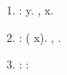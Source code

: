 \documentclass[a4paper]{article}
\newcommand\textstyleStrongEmphasis[1]{\textbf{#1}}
\newcommand\liststyleLiv{%
\renewcommand\theenumi{\arabic{enumi}}
\renewcommand\labelenumi{\theenumi.}
\renewcommand\labelitemi{{\textbullet}}
\renewcommand\labelitemii{{\textbullet}}
\renewcommand\labelitemiii{{\textbullet}}
}
\begin{document}
\liststyleLiv
\begin{enumerate}
\item {
\textstyleStrongEmphasis{\textmd{{\CYRP}{\cyro}{\cyri}{\cyrs}{\cyrk}
{\cyrn}{\cyra}{\cyrch}{\cyra}{\cyrl}{\cyrsftsn}{\cyrn}{\cyro}{\cyrishrt}
{\cyrt}{\cyro}{\cyrch}{\cyrk}{\cyri}}}:\newline
{\CYRV}{\cyrery}{\cyrb}{\cyri}{\cyrr}{\cyra}{\cyre}{\cyrt}{\cyrs}{\cyrya} {\cyrt}{\cyro}{\cyrch}{\cyrk}{\cyra} {\cyrs}
{\cyrm}{\cyri}{\cyrn}{\cyri}{\cyrm}{\cyra}{\cyrl}{\cyrsftsn}{\cyrn}{\cyro}{\cyrishrt}
{\cyrk}{\cyro}{\cyro}{\cyrr}{\cyrd}{\cyri}{\cyrn}{\cyra}{\cyrt}{\cyro}{\cyrishrt} y. {\CYRE}{\cyrs}{\cyrl}{\cyri}
{\cyrt}{\cyra}{\cyrk}{\cyri}{\cyrh} {\cyrn}{\cyre}{\cyrs}{\cyrk}{\cyro}{\cyrl}{\cyrsftsn}{\cyrk}{\cyro},
{\cyrb}{\cyre}{\cyrr}{\cyre}{\cyrt}{\cyrs}{\cyrya} {\cyrt}{\cyro}{\cyrch}{\cyrk}{\cyra} {\cyrs}
{\cyrm}\foreignlanguage{russian}{{\cyra}{\cyrk}{\cyrs}{\cyri}{\cyrm}{\cyra}{\cyrl}{\cyrsftsn}{\cyrn}{\cyro}{\cyrishrt}}
{\cyrk}{\cyro}{\cyro}{\cyrr}{\cyrd}{\cyri}{\cyrn}{\cyra}{\cyrt}{\cyro}{\cyrishrt} x.}
\item {
\textstyleStrongEmphasis{\textmd{{\CYRS}{\cyro}{\cyrr}{\cyrt}{\cyri}{\cyrr}{\cyro}{\cyrv}{\cyrk}{\cyra}
{\cyrt}{\cyro}{\cyrch}{\cyre}{\cyrk}}}:\newline
{\CYRV}{\cyrs}{\cyre} {\cyro}{\cyrs}{\cyrt}{\cyra}{\cyrl}{\cyrsftsn}{\cyrn}{\cyrery}{\cyre}
{\cyrt}{\cyro}{\cyrch}{\cyrk}{\cyri} {\cyrs}{\cyro}{\cyrr}{\cyrt}{\cyri}{\cyrr}{\cyru}{\cyryu}{\cyrt}{\cyrs}{\cyrya}
{\cyrp}{\cyro} {\cyrp}{\cyro}{\cyrl}{\cyrya}{\cyrr}{\cyrn}{\cyro}{\cyrm}{\cyru} {\cyru}{\cyrg}{\cyrl}{\cyru}
{\cyro}{\cyrt}{\cyrn}{\cyro}{\cyrs}{\cyri}{\cyrt}{\cyre}{\cyrl}{\cyrsftsn}{\cyrn}{\cyro}
{\cyrn}{\cyra}{\cyrch}{\cyra}{\cyrl}{\cyrsftsn}{\cyrn}{\cyro}{\cyrishrt} {\cyrt}{\cyro}{\cyrch}{\cyrk}{\cyri}
({\cyro}{\cyrt}{\cyrn}{\cyro}{\cyrs}{\cyri}{\cyrt}{\cyre}{\cyrl}{\cyrsftsn}{\cyrn}{\cyro} {\cyro}{\cyrs}{\cyri} x).
{\CYRE}{\cyrs}{\cyrl}{\cyri} {\cyru}{\cyrg}{\cyrl}{\cyrery}
{\cyrs}{\cyro}{\cyrv}{\cyrp}{\cyra}{\cyrd}{\cyra}{\cyryu}{\cyrt}, {\cyrt}{\cyro}
{\cyrb}{\cyrl}{\cyri}{\cyrzh}{\cyrn}{\cyri}{\cyre} {\cyrk}
{\cyrn}{\cyra}{\cyrch}{\cyra}{\cyrl}{\cyrsftsn}{\cyrn}{\cyro}{\cyrishrt} {\cyrt}{\cyro}{\cyrch}{\cyrk}{\cyre}
{\cyri}{\cyrd}{\cyru}{\cyrt} {\cyrp}{\cyre}{\cyrr}{\cyrv}{\cyrery}{\cyrm}{\cyri}.}
\item {
\textstyleStrongEmphasis{\textmd{{\CYRI}{\cyrt}{\cyre}{\cyrr}{\cyra}{\cyrc}{\cyri}{\cyrya} {\cyrp}{\cyro}
{\cyrt}{\cyro}{\cyrch}{\cyrk}{\cyra}{\cyrm}}}:\newline
{\CYRS}{\cyrk}{\cyra}{\cyrn}{\cyri}{\cyrr}{\cyro}{\cyrv}{\cyra}{\cyrn}{\cyri}{\cyre}
{\cyrp}{\cyrr}{\cyro}{\cyrh}{\cyro}{\cyrd}{\cyri}{\cyrt} {\cyrp}{\cyro}
{\cyro}{\cyrt}{\cyrs}{\cyro}{\cyrr}{\cyrt}{\cyri}{\cyrr}{\cyro}{\cyrv}{\cyra}{\cyrn}{\cyrn}{\cyrery}{\cyrm}
{\cyrt}{\cyro}{\cyrch}{\cyrk}{\cyra}{\cyrm}:}


\end{enumerate}
\end{document}
